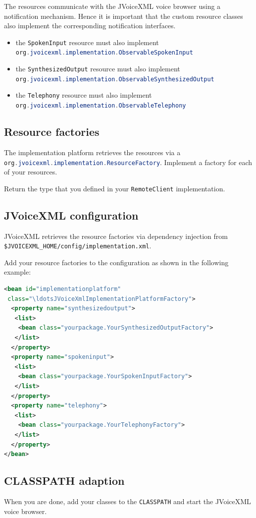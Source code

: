 \documentclass[11pt,a4paper]{article}
\begin{document}
The resources communicate with the JVoiceXML voice browser using a
notification mechanism. Hence it is important that the custom resource classes also implement
the corresponding notification interfaces.

\begin{itemize}
  \item the \lstinline[language=Java]{SpokenInput} resource must also implement
  \\
  \lstinline[language=Java]{org.jvoicexml.implementation.ObservableSpokenInput}
  \item the \lstinline[language=Java]{SynthesizedOutput} resource must also
  implement \\
  \lstinline[language=Java]{org.jvoicexml.implementation.ObservableSynthesizedOutput}
  \item the \lstinline[language=Java]{Telephony} resource must also implement \\
  \lstinline[language=Java]{org.jvoicexml.implementation.ObservableTelephony}
\end{itemize}

\subsection{Resource factories}

The implementation platform retrieves the resources via a
\lstinline[language=Java]{org.jvoicexml.implementation.ResourceFactory}.
Implement a factory for each of your resources.

Return the type that you defined in your
\lstinline[language=Java]{RemoteClient} implementation.

\subsection{JVoiceXML configuration}

JVoiceXML retrieves the resource factories via dependency injection from
\lstinline{$JVOICEXML_HOME/config/implementation.xml}.

Add your resource factories to the configuration as shown in the following
example:

\begin{lstlisting}[language=XML]
<bean id="implementationplatform"
 class="\ldotsJVoiceXmlImplementationPlatformFactory">
  <property name="synthesizedoutput">
   <list>
    <bean class="yourpackage.YourSynthesizedOutputFactory">
   </list>
  </property>
  <property name="spokeninput">
   <list>
    <bean class="yourpackage.YourSpokenInputFactory">
   </list>
  </property>
  <property name="telephony">
   <list>
    <bean class="yourpackage.YourTelephonyFactory">
   </list>
  </property>
</bean>
\end{lstlisting}

\subsection{CLASSPATH adaption}

When you are done, add your classes to the \lstinline{CLASSPATH} and start the
JVoiceXML voice browser.



\end{document}
